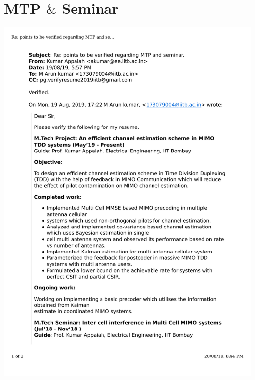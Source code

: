 \documentclass{article}
\begin{document}
\section{MTP $\&$ Seminar}
	\includegraphics[page=1, scale=0.5]{proofs/mtp.pdf}\\
\end{document}

